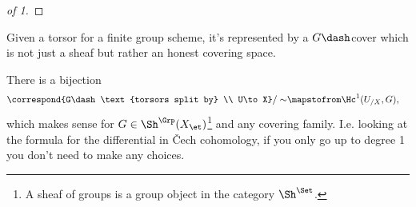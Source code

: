 \begin{example}[?]
\begin{proof}[of 1]
\end{proof}

\end{example}

\begin{remark}

Given a torsor for a finite group scheme, it's represented by a
\(G\dash\)cover which is not just a sheaf but rather an honest covering
space.

\end{remark}

\begin{proposition}[Interpretation of $H^1$]

There is a bijection
\begin{align*}  
\correspond{G\dash\text{torsors split by} \\ U\to X} / \sim
&\mapstofrom
\Hc^1(U_{/X}, G)
,\end{align*} which makes sense for \(G\in \Sh^\Grp(X_\et)\)\footnote{A
  sheaf of groups is a group object in the category \(\Sh^\Set\).} and
any covering family. I.e. looking at the formula for the differential in
Čech cohomology, if you only go up to degree 1 you don't need to make
any choices.

\end{proposition}

